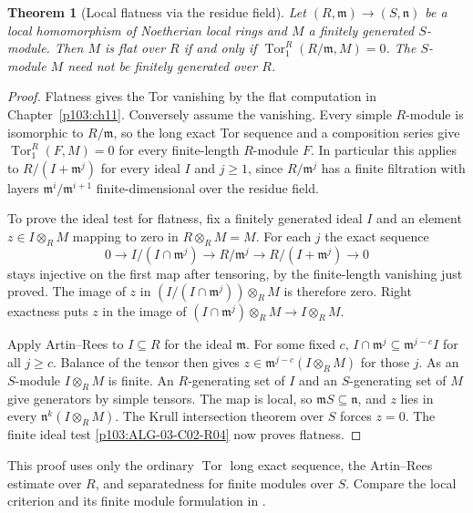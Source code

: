 \documentclass[11pt,oneside,openany]{book}
\newtheorem{theorem}{Theorem}[chapter]
\theoremstyle{definition}
\theoremstyle{remark}
\begin{document}
\begin{theorem}[Local flatness via the residue field]
\label{p103:ALG-05-C04-S03}
Let \((R,\mathfrak m)\to(S,\mathfrak n)\) be a local
homomorphism of Noetherian local rings and \(M\) a finitely
generated \(S\)-module. Then \(M\) is flat over \(R\) if and
only if
\(\operatorname{Tor}_1^R(R/\mathfrak m,M)=0\).
The \(S\)-module \(M\) need not be finitely generated over \(R\).
\end{theorem}
\begin{proof}
Flatness gives the Tor vanishing by the flat computation in
Chapter~\ref{p103:ch11}. Conversely assume the vanishing.
Every simple \(R\)-module is isomorphic to \(R/\mathfrak m\),
so the long exact Tor sequence and a composition series give
\(\operatorname{Tor}_1^R(F,M)=0\) for every finite-length
\(R\)-module \(F\). In particular this applies to
\(R/(I+\mathfrak m^j)\) for every ideal \(I\) and \(j\ge1\), since
\(R/\mathfrak m^j\) has a finite filtration with layers
\(\mathfrak m^i/\mathfrak m^{i+1}\) finite-dimensional over the
residue field.

To prove the ideal test for flatness, fix a finitely generated
ideal \(I\) and an element \(z\in I\otimes_R M\) mapping to zero
in \(R\otimes_R M=M\). For each \(j\) the exact sequence
\[
 0\longrightarrow I/(I\cap\mathfrak m^j)
 \longrightarrow R/\mathfrak m^j
 \longrightarrow R/(I+\mathfrak m^j)\longrightarrow0
\]
stays injective on the first map after tensoring, by the
finite-length vanishing just proved. The image of \(z\) in
\((I/(I\cap\mathfrak m^j))\otimes_R M\) is therefore zero.
Right exactness puts \(z\) in the image of
\((I\cap\mathfrak m^j)\otimes_R M\to I\otimes_R M\).

Apply Artin--Rees to \(I\subseteq R\) for the ideal \(\mathfrak m\).
For some fixed \(c\), \(I\cap\mathfrak m^j\subseteq
\mathfrak m^{j-c}I\) for all \(j\ge c\). Balance of the tensor
then gives \(z\in \mathfrak m^{j-c}(I\otimes_R M)\) for those
\(j\). As an \(S\)-module \(I\otimes_R M\) is finite. An
\(R\)-generating set of \(I\) and an \(S\)-generating set of
\(M\) give generators by simple tensors. The map is local,
so \(\mathfrak m S\subseteq\mathfrak n\), and \(z\) lies in
every \(\mathfrak n^k(I\otimes_R M)\). The Krull intersection
theorem over \(S\) forces \(z=0\). The finite ideal test
\cref{p103:ALG-03-C02-R04} now proves flatness.
\end{proof}
This proof uses only the ordinary \(\operatorname{Tor}\)
long exact sequence, the Artin--Rees estimate over \(R\),
and separatedness for finite modules over \(S\). Compare the
local criterion and its finite module formulation in
\cite[Theorem 6.8 and Corollary 6.9]{eisenbud}.
\end{document}
